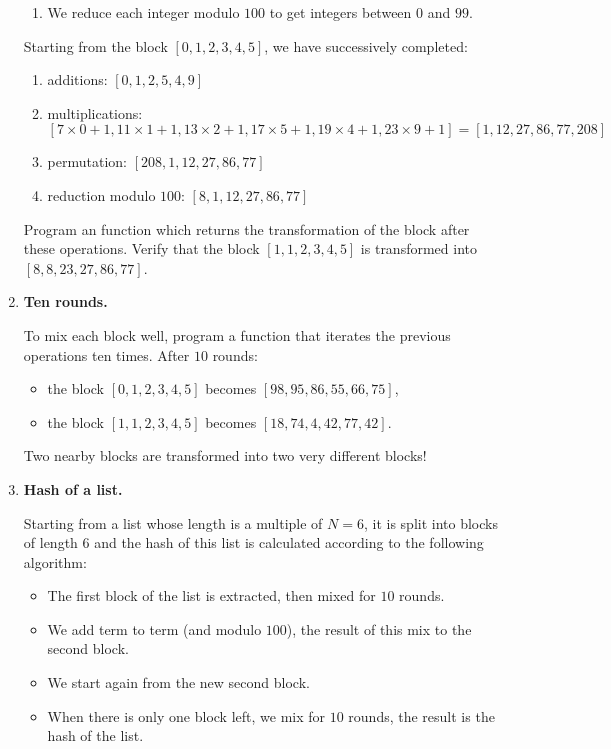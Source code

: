 \documentclass[11pt,class=report,crop=false]{standalone}
\begin{document}
\begin{activite}
\begin{enumerate}
\begin{enumerate}
    \item We reduce each integer modulo $100$ to get integers between $0$ and $99$.
  \end{enumerate}



  
  Starting from the block $[0, 1, 2, 3, 4, 5]$, we have successively completed:
   \begin{enumerate}
    \item additions: $[0, 1, 2, 5, 4, 9]$
    
    \item multiplications: $[7\times 0 + 1, 11\times 1+1, 13\times 2+1, 17 \times 5+1,19 \times  4+1, 23 \times 9+1] = [1,12,27,86,77,208]$ 
    
    \item permutation: $[208,1,12,27,86,77]$
    
    \item reduction modulo $100$: $[8,1,12,27,86,77]$
  \end{enumerate}
  
  Program an  function which returns the transformation of the block after these operations. Verify that the block $[1, 1, 2, 3, 4, 5]$ is transformed into $[8, 8, 23, 27, 86, 77]$.
 
    \item \textbf{Ten rounds.} 
    
    To mix each block well, program a  function that iterates the previous operations ten times.
    After $10$ rounds:
    \begin{itemize}
      \item the block $[0, 1, 2, 3, 4, 5]$ becomes $[98, 95, 86, 55, 66, 75]$,
      \item the block $[1, 1, 2, 3, 4, 5]$ becomes $[18, 74, 4, 42, 77, 42]$.
    \end{itemize}
 Two nearby blocks are transformed into two very different blocks! 
   
   \item \textbf{Hash of a list.} 
   
   Starting from a list whose length is a multiple of $N=6$, it is split into blocks of length $6$ and the hash of this list is calculated according to the following algorithm:
   \begin{itemize}
     \item The first block of the list is extracted, then mixed for $10$ rounds.
     \item We add term to term (and modulo $100$), the result of this mix to the second block.
     \item We start again from the new second block.
     \item When there is only one block left, we mix for $10$ rounds, the result is the hash of the list.
   \end{itemize}
 

\end{enumerate}
\end{activite}
\end{document}
